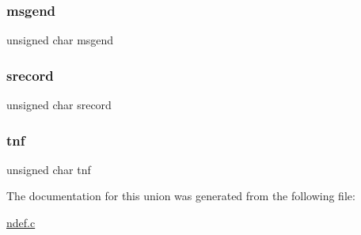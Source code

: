 \subsubsection{\texorpdfstring{msgend}{msgend}}
{\footnotesize\ttfamily unsigned char msgend}

\mbox{\label{union_record_header__t_a17ee86011122945c7daa15b3bbbbe7d1}} 
\subsubsection{\texorpdfstring{srecord}{srecord}}
{\footnotesize\ttfamily unsigned char srecord}

\mbox{\label{union_record_header__t_ad725e8d4364cd9dd0b30d3e78efd1cf6}} 
\subsubsection{\texorpdfstring{tnf}{tnf}}
{\footnotesize\ttfamily unsigned char tnf}



The documentation for this union was generated from the following file\+:\begin{DoxyCompactItemize}
\item 
\mbox{\hyperlink{ndef_8c}{ndef.\+c}}\end{DoxyCompactItemize}
